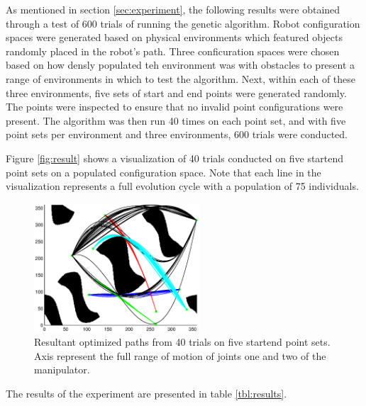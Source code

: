 
As mentioned in section \ref{sec:experiment}, the following results were obtained through a test of 600 trials of running the genetic algorithm. Robot configuration spaces were generated based on physical environments which featured objects randomly placed in the robot's path. Three conficuration spaces were chosen based on how densly populated teh environment was with obstacles to present a range of environments in which to test the algorithm. Next, within each of these three environments, five sets of start and end points were generated randomly. The points were inspected to ensure that no invalid point configurations were present. The algorithm was then run 40 times on each point set, and with five point sets per environment and three environments, 600 trials were conducted.

Figure \ref{fig:result} shows a visualization of 40 trials conducted on five start\/end point sets on a populated configuration space. Note that each line in the visualization represents a full evolution cycle with a population of 75 individuals.

\begin{figure}[h] \label{fig:result}
	\centering
	\includegraphics[width=0.55\textwidth]{./figures/results_cSpace4.eps}
	\caption{Resultant optimized paths from 40 trials on five start\/end point sets. Axis represent the full range of motion of joints one and two of the manipulator.}
	\label{fig:ws2cs}
\end{figure}

The results of the experiment are presented in table \ref{tbl:results}.

